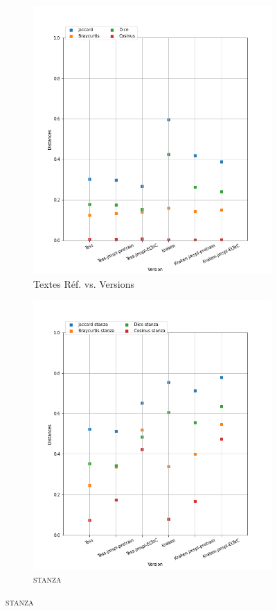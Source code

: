 \begin{figure}
\begin{minipage}{6cm}
  \begin{subfigure}{0.89\textwidth}
  \includegraphics[width=.89\textwidth]{IMAGES/ELTeC_DISTANCES_spaCy3.5.1/BRONTE-Wuthering-heights-graph-dist-spaCy3.5.1-txt.png} 
  \caption{Textes Réf. vs. Versions}
  \label{fig:BRONTE-txt}
  \end{subfigure}
  \end{minipage}
  \begin{minipage}{6cm}
  \begin{subfigure}{0.89\textwidth}
  \includegraphics[width=.89\textwidth]{IMAGES/ELTeC_DISTANCES_stanza/BRONTE-Wuthering-heights-graph-dist-stanza-stanza.png}
   \caption{\textsc{stanza}}
 

\end{subfigure}
\end{minipage}
\end{figure}
